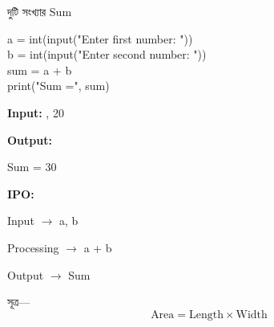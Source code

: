 \begin{codeoutputbox}{দুটি সংখ্যার Sum}

\noindent
\begin{minipage}[t]{0.57\linewidth}
\codeheading

\begin{english}
\ttfamily
a = int(input("Enter first number: "))\\
b = int(input("Enter second number: "))\\[0.5mm]
sum = a + b\\
print("Sum =", sum)
\end{english}

\end{minipage}
\hfill
\begin{minipage}[t]{0.39\linewidth}
\outputheading

\textbf{Input:}
\textenglish{, 20}

\medskip

\textbf{Output:}

\textenglish{\ttfamily Sum = 30}

\medskip

\textbf{IPO:}

Input \(\rightarrow\) \textenglish{\ttfamily a, b}

Processing \(\rightarrow\)
\textenglish{\ttfamily a + b}

Output \(\rightarrow\) Sum

\end{minipage}

\end{codeoutputbox}



সূত্র—
\[
\text{Area} = \text{Length} \times \text{Width}
\]


